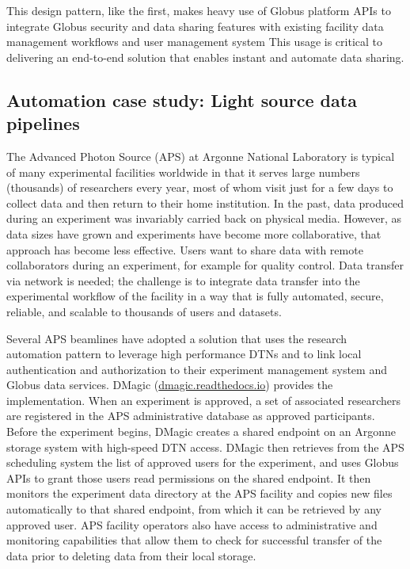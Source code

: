 \documentclass[10pt]{article}
\begin{document}
This design pattern, like the first, makes heavy use of Globus platform APIs to integrate Globus security and data sharing features with existing facility data management workflows and user management system
This usage is critical to delivering an end-to-end solution that 
enables instant and automate data sharing. %



\subsection*{Automation case study: Light source data pipelines}

The Advanced Photon Source (APS) at Argonne National Laboratory is typical of many experimental facilities
worldwide in that it serves large numbers (thousands) of researchers every year,
most of whom visit just for a few days to collect data and then return to their home institution.
In the past, data produced during an experiment was invariably carried back on physical media.
However, as data sizes have grown and experiments have become more collaborative,
that approach has become less effective.
Users want to share data with remote collaborators during an experiment, 
for example for quality control.
Data transfer via network is needed;
the challenge is to integrate data transfer into the experimental workflow of the facility
in a way that is fully automated, secure, reliable, and scalable to thousands of users and datasets.

Several APS beamlines have adopted a solution that uses the research automation pattern to
leverage high performance DTNs
and to link local authentication and authorization to their experiment management system and Globus data services. 
DMagic (\url{dmagic.readthedocs.io}) provides the implementation.
When an experiment is approved,
a set of associated researchers are registered in the APS administrative database as approved participants.
Before the experiment begins,
DMagic creates a shared endpoint on an Argonne storage system with high-speed DTN access.
DMagic then retrieves from the APS scheduling system the list of approved users for the experiment,
and uses Globus APIs to grant those users read permissions on the shared endpoint.
It then monitors the experiment data directory at the APS facility and copies
new files automatically to that shared endpoint,
from which it can be retrieved by any approved user.
APS facility operators also have access to administrative and monitoring capabilities that allow them to check for successful transfer of the data prior to deleting data from their local storage.
\end{document}
